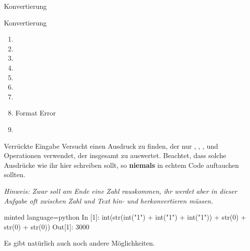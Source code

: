 \begin{task}[points=auto]{Konvertierung }
\begin{subtask*}[points=0]{Konvertierung}
        \begin{solution}
            \begin{multicols}{3}
                \begin{enumerate}
                    \item {}
                    \item {}
                    \item {}
                    \item {}
                    \item {}
                    \item {}
                    \item {}
                    \item Format Error
                    \item {}
                \end{enumerate}
            \end{multicols}
        \end{solution}
    \end{subtask*}
    \begin{subtask*}[points=0]{Verrückte Eingabe }
        Versucht einen Ausdruck zu finden, der nur , ,
        ,  und Operationen verwendet, der
        insgesamt zu  auswertet. Beachtet, dass solche Ausdrücke
        wie ihr hier schreiben sollt, so \textbf{niemals} in echtem Code auftauchen
        sollten.

        \textit{Hinweis: Zwar soll am Ende eine Zahl rauskommen, ihr werdet aber in dieser Aufgabe oft zwischen Zahl und Text hin- und herkonvertieren müssen.}

        \begin{solution}
            \begin{codeBlock}[]{minted language=python}
                In [1]: int(str(int("1") + int("1") + int("1")) + str(0) + str(0) + str(0))
                Out[1]: 3000
            \end{codeBlock}
            Es gibt natürlich auch noch andere Möglichkeiten.
        \end{solution}
    \end{subtask*}
\end{task}
